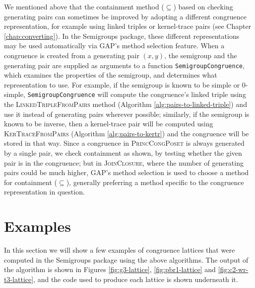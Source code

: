 We mentioned above that the containment method ($\subseteq$) based on checking
generating pairs can sometimes be improved by adopting a different congruence
representation, for example using linked triples or kernel-trace pairs (see
Chapter \ref{chap:converting}).  In the Semigroups package, these different
representations may be used automatically via GAP's method selection feature.
When a congruence is created from a generating pair $(x,y)$, the semigroup and
the generating pair are supplied as arguments to a function
\texttt{SemigroupCongruence}, which examines the properties of the semigroup,
and determines what representation to use.  For example, if the semigroup is
known to be simple or 0-simple, \texttt{SemigroupCongruence} will compute the
congruence's linked triple using the \textsc{LinkedTripleFromPairs} method
(Algorithm \ref{alg:pairs-to-linked-triple}) and use it instead of generating
pairs wherever possible; similarly, if the semigroup is known to be inverse,
then a kernel-trace pair will be computed using \textsc{KerTraceFromPairs}
(Algorithm \ref{alg:pairs-to-kertr}) and the congruence will be stored in that
way.  Since a congruence in \textsc{PrincCongPoset} is always generated by a
single pair, we check containment as shown, by testing whether the given pair is
in the congruence; but in \textsc{JoinClosure}, where the number of generating
pairs could be much higher, GAP's method selection is used to choose a method
for containment ($\subseteq$), generally preferring a method specific to the
congruence representation in question.

\section{Examples}
\label{sec:lattice-examples}

In this section we will show a few examples of congruence lattices that were
computed in the Semigroups package \cite{semigroups} using the above algorithms.
The output of the algorithm is shown in Figures \ref{fig:g3-lattice},
\ref{fig:pbr1-lattice} and \ref{fig:c2-wr-t3-lattice}, and the code used to
produce each lattice is shown underneath it.

